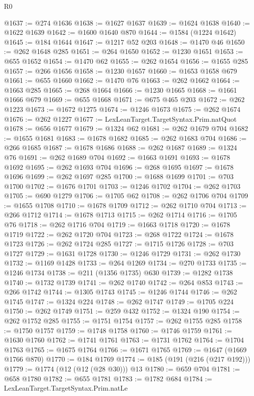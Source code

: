 \begin{lexlean}{R0}
\begin{coremodule}
@1637 := @274 @1636
@1638 := @1627 @1637
@1639 := @1624 @1638
@1640 := @1622 @1639
@1642 := @1600 @1640 @870
@1644 := @1584 (@1224 @1642)
@1645 := @184 @1644
@1647 := @1217 @52 @203
@1648 := @1470 @46
@1650 := @262 @1648 @285
@1651 := @264 @1650
@1652 := @1230 @1651
@1653 := @655 @1652
@1654 := @1470 @62
@1655 := @262 @1654
@1656 := @1655 @285
@1657 := @266 @1656
@1658 := @1230 @1657
@1660 := @1653 @1658 @679
@1661 := @655 @1660
@1662 := @1470 @76
@1663 := @262 @1662
@1664 := @1663 @285
@1665 := @268 @1664
@1666 := @1230 @1665
@1668 := @1661 @1666 @679
@1669 := @655 @1668
@1671 := @675 @465 @203
@1672 := @262 @1223
@1673 := @1672 @1275
@1674 := @1246 @1673
@1675 := @262 @1674
@1676 := @262 @1227
@1677 := LexLeanTarget.TargetSyntax.Prim.natQuot
@1678 := @656 @1677
@1679 := @1324 @62
@1681 := @262 @1679 @704
@1682 := @1655 @1681
@1683 := @1678 @1682
@1685 := @262 @1683 @704
@1686 := @266 @1685
@1687 := @1678 @1686
@1688 := @262 @1687
@1689 := @1324 @76
@1691 := @262 @1689 @704
@1692 := @1663 @1691
@1693 := @1678 @1692
@1695 := @262 @1693 @704
@1696 := @268 @1695
@1697 := @1678 @1696
@1699 := @262 @1697 @285
@1700 := @1688 @1699
@1701 := @703 @1700
@1702 := @1676 @1701
@1703 := @1246 @1702
@1704 := @262 @1703
@1705 := @690 @1279
@1706 := @1705 @62
@1708 := @262 @1706 @704
@1709 := @1655 @1708
@1710 := @1678 @1709
@1712 := @262 @1710 @704
@1713 := @266 @1712
@1714 := @1678 @1713
@1715 := @262 @1714
@1716 := @1705 @76
@1718 := @262 @1716 @704
@1719 := @1663 @1718
@1720 := @1678 @1719
@1722 := @262 @1720 @704
@1723 := @268 @1722
@1724 := @1678 @1723
@1726 := @262 @1724 @285
@1727 := @1715 @1726
@1728 := @703 @1727
@1729 := @1631 @1728
@1730 := @1246 @1729
@1731 := @262 @1730
@1732 := @1169 @1428
@1733 := @264 @1269
@1734 := @270 @1733
@1735 := @1246 @1734
@1738 := @211 (@1356 @1735) @630
@1739 := @1282 @1738
@1740 := @1732 @1739
@1741 := @262 @1740
@1742 := @264 @853
@1743 := @266 @1742
@1744 := @1305 @1743
@1745 := @1246 @1744
@1746 := @262 @1745
@1747 := @1324 @224
@1748 := @262 @1747
@1749 := @1705 @224
@1750 := @262 @1749
@1751 := @259 @432
@1752 := @1324 @190
@1754 := @262 @1752 @285
@1755 := @1751 @1754
@1757 := @262 @1755 @285
@1758 := @1750 @1757
@1759 := @1748 @1758
@1760 := @1746 @1759
@1761 := @1630 @1760
@1762 := @1741 @1761
@1763 := @1731 @1762
@1764 := @1704 @1763
@1765 := @1675 @1764
@1766 := @1671 @1765
@1769 := @1647 (@1669 @1766 @870)
@1770 := @184 @1769
@1774 := @185 (@191 (@216 (@217 @192)))
@1779 := @1774 (@12 (@12 (@28 @30))) @13
@1780 := @659 @704
@1781 := @658 @1780
@1782 := @655 @1781
@1783 := @1782 @684
@1784 := LexLeanTarget.TargetSyntax.Prim.natLe

\end{coremodule}
\end{lexlean}
